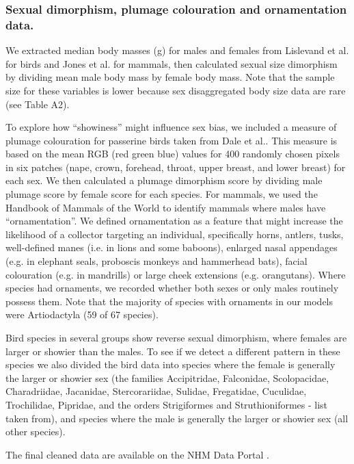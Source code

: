 \documentclass[a4paper, 12pt]{article}
\begin{document}
\subsubsection{Sexual dimorphism, plumage colouration and ornamentation data.}
We extracted median body masses (g) for males and females from Lislevand et al.\cite{lislevand2007avian} for birds and Jones et al.\cite{pantheria} for mammals, then calculated sexual size dimorphism by dividing mean male body mass by female body mass. 
Note that the sample size for these variables is lower because sex disaggregated body size data are rare (see Table A2).

To explore how ``showiness'' might influence sex bias, we included a measure of plumage colouration for passerine birds taken from Dale et al.\cite{dale2015data,dale2015effects}. 
This measure is based on the mean RGB (red green blue) values for 400 randomly chosen pixels in six patches (nape, crown, forehead, throat, upper breast, and lower breast) for each sex. 
We then calculated a plumage dimorphism score by dividing male plumage score by female score for each species. 
For mammals, we used the Handbook of Mammals of the World to identify mammals where males have ``ornamentation''. 
We defined ornamentation as a feature that might increase the likelihood of a collector targeting an individual, specifically horns, antlers, tusks, well-defined manes (i.e. in lions and some baboons), enlarged nasal appendages (e.g. in elephant seals, proboscis monkeys and hammerhead bats), facial colouration (e.g. in mandrills) or large cheek extensions (e.g. orangutans). 
Where species had ornaments, we recorded whether both sexes or only males routinely possess them. 
Note that the majority of species with ornaments in our models were Artiodactyla (59 of 67 species). 

Bird species in several groups show reverse sexual dimorphism, where females are larger or showier than the males. 
To see if we detect a different pattern in these species we also divided the bird data into species where the female is generally the larger or showier sex (the families  Accipitridae, Falconidae, Scolopacidae, Charadriidae, Jacanidae, Stercorariidae, Sulidae, Fregatidae, Cuculidae, Trochilidae, Pipridae, and the orders Strigiformes and Struthioniformes - list taken from\cite{swaddle2000novel}), and species where the male is generally the larger or showier sex (all other species). 

The final cleaned data are available on the NHM Data Portal \cite{sex-bias-data}. 
\end{document}
